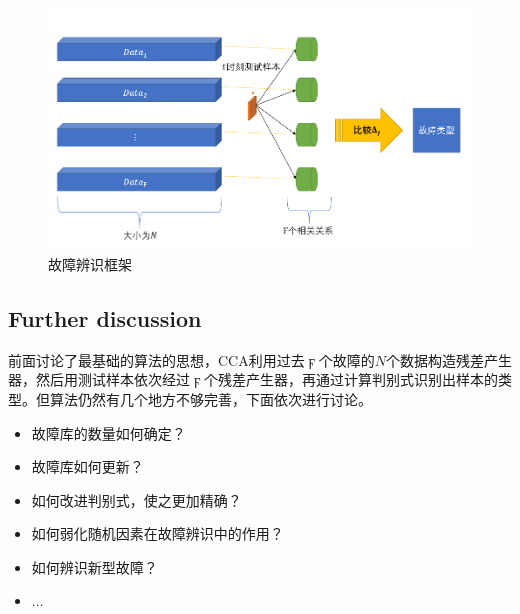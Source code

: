 \documentclass[lang=cn,11pt,a4paper]{elegantpaper}
\begin{document}
\begin{figure}[H] %
	\centering %
	\includegraphics[width=1.0\textwidth]{figure2} %
	\caption{故障辨识框架} %
	\label{Fig.main1} %
\end{figure}
\subsection{Further discussion}
前面讨论了最基础的算法的思想，CCA利用过去$\digamma$个故障的$N$个数据构造残差产生器，然后用测试样本依次经过$\digamma$个残差产生器，再通过计算判别式识别出样本的类型。但算法仍然有几个地方不够完善，下面依次进行讨论。
\begin{itemize}
	\item 故障库的数量如何确定？
	\item 故障库如何更新？
	\item 如何改进判别式，使之更加精确？
	\item 如何弱化随机因素在故障辨识中的作用？
	\item 如何辨识新型故障？
	\item $\ldots$
\end{itemize}
\end{document}

